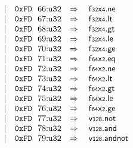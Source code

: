 $$\begin{array}[t]{@{}lrrl@{}l@{}l@{}l@{}}
& & | & \mathtt{0xFD}~~66{:}{\mathtt{u32}} & \quad\Rightarrow\quad{} & {\mathsf{f{\scriptstyle 32}}}{\mathsf{x}}{\mathsf{{\scriptstyle 4}}} {.} \mathsf{ne} \\
& & | & \mathtt{0xFD}~~67{:}{\mathtt{u32}} & \quad\Rightarrow\quad{} & {\mathsf{f{\scriptstyle 32}}}{\mathsf{x}}{\mathsf{{\scriptstyle 4}}} {.} \mathsf{lt} \\
& & | & \mathtt{0xFD}~~68{:}{\mathtt{u32}} & \quad\Rightarrow\quad{} & {\mathsf{f{\scriptstyle 32}}}{\mathsf{x}}{\mathsf{{\scriptstyle 4}}} {.} \mathsf{gt} \\
& & | & \mathtt{0xFD}~~69{:}{\mathtt{u32}} & \quad\Rightarrow\quad{} & {\mathsf{f{\scriptstyle 32}}}{\mathsf{x}}{\mathsf{{\scriptstyle 4}}} {.} \mathsf{le} \\
& & | & \mathtt{0xFD}~~70{:}{\mathtt{u32}} & \quad\Rightarrow\quad{} & {\mathsf{f{\scriptstyle 32}}}{\mathsf{x}}{\mathsf{{\scriptstyle 4}}} {.} \mathsf{ge} \\
& & | & \mathtt{0xFD}~~71{:}{\mathtt{u32}} & \quad\Rightarrow\quad{} & {\mathsf{f{\scriptstyle 64}}}{\mathsf{x}}{\mathsf{{\scriptstyle 2}}} {.} \mathsf{eq} \\
& & | & \mathtt{0xFD}~~72{:}{\mathtt{u32}} & \quad\Rightarrow\quad{} & {\mathsf{f{\scriptstyle 64}}}{\mathsf{x}}{\mathsf{{\scriptstyle 2}}} {.} \mathsf{ne} \\
& & | & \mathtt{0xFD}~~73{:}{\mathtt{u32}} & \quad\Rightarrow\quad{} & {\mathsf{f{\scriptstyle 64}}}{\mathsf{x}}{\mathsf{{\scriptstyle 2}}} {.} \mathsf{lt} \\
& & | & \mathtt{0xFD}~~74{:}{\mathtt{u32}} & \quad\Rightarrow\quad{} & {\mathsf{f{\scriptstyle 64}}}{\mathsf{x}}{\mathsf{{\scriptstyle 2}}} {.} \mathsf{gt} \\
& & | & \mathtt{0xFD}~~75{:}{\mathtt{u32}} & \quad\Rightarrow\quad{} & {\mathsf{f{\scriptstyle 64}}}{\mathsf{x}}{\mathsf{{\scriptstyle 2}}} {.} \mathsf{le} \\
& & | & \mathtt{0xFD}~~76{:}{\mathtt{u32}} & \quad\Rightarrow\quad{} & {\mathsf{f{\scriptstyle 64}}}{\mathsf{x}}{\mathsf{{\scriptstyle 2}}} {.} \mathsf{ge} \\
& & | & \mathtt{0xFD}~~77{:}{\mathtt{u32}} & \quad\Rightarrow\quad{} & \mathsf{v{\scriptstyle 128}} {.} \mathsf{not} \\
& & | & \mathtt{0xFD}~~78{:}{\mathtt{u32}} & \quad\Rightarrow\quad{} & \mathsf{v{\scriptstyle 128}} {.} \mathsf{and} \\
& & | & \mathtt{0xFD}~~79{:}{\mathtt{u32}} & \quad\Rightarrow\quad{} & \mathsf{v{\scriptstyle 128}} {.} \mathsf{andnot} \\

\end{array}$$
